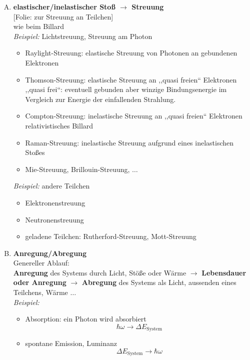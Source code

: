 \documentclass[titlepage,11pt,a4paper,ngerman]{report}
\newcommand{\tx}[1]{\textrm{#1}}
\newcommand{\folie}[1]{\color{gray}[Folie: #1]\color{black}}
\newcommand{\lcom}[1]{\color{MidnightBlue}#1\color{black}}
\begin{document}
\begin{enumerate}[A)]
	\item \textbf{ elastischer/inelastischer Stoß $ \rightarrow $ Streuung}\\
	\folie{zur Streuung an Teilchen}\\
	wie beim Billard\\[5pt]
	\emph{Beispiel:} Lichtstreuung, Streuung am Photon
	\begin{itemize}
		\item Raylight-Streuung: elastische Streuung von Photonen an gebundenen Elektronen
		\item Thomson-Streuung: elastische Streuung an ,,quasi freien`` Elektronen
		\lcom{,,quasi frei``: eventuell gebunden aber winzige Bindungsenergie im Vergleich zur Energie der einfallenden Strahlung.}
		\item Compton-Streuung: inelastische Streuung an ,,quasi freien`` Elektronen\\
		relativistisches Billard
		\item Raman-Streuung: inelastische Streuung aufgrund eines inelastischen Stoßes
		\item Mie-Streuung, Brillouin-Streuung, $ \dots $
	\end{itemize}
	\emph{Beispiel:} andere Teilchen
	\begin{itemize}
		\item Elektronenstreuung
		\item Neutronenstreuung
		\item geladene Teilchen: Rutherford-Streuung, Mott-Streuung
	\end{itemize}
	\item \textbf{Anregung/Abregung}\\
	Genereller Ablauf:\\
	\textbf{Anregung} des Systems durch Licht, Stöße oder Wärme $ \rightarrow $ \textbf{Lebensdauer oder Anregung} $ \rightarrow $ \textbf{Abregung} des Systems als Licht, aussenden eines Teilchens, Wärme $ \dots $\\[5pt]
	\emph{Beispiel:}
	\begin{itemize}
		\item Absorption: ein Photon wird absorbiert
		\begin{equation*}
		\hbar \omega \rightarrow \Delta E_{\tx{System}}  %
		\end{equation*}
		\item spontane Emission, Luminanz
		\begin{equation*}
		\Delta E_{\tx{System}} \rightarrow \hbar \omega

\end{equation*}
\end{itemize}
\end{enumerate}
\end{document}
